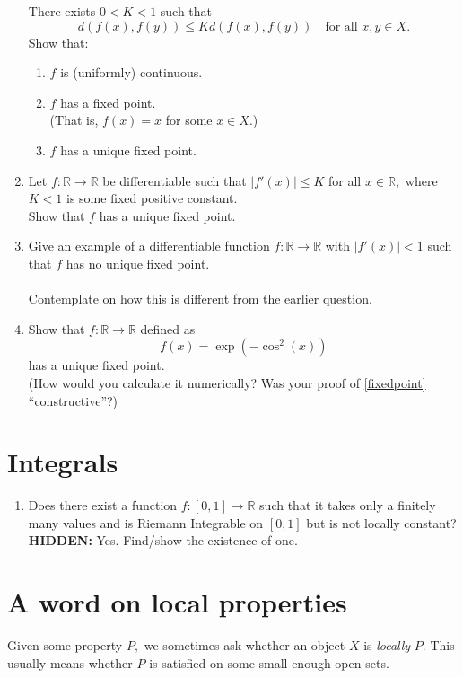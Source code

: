 \documentclass[12pt]{article}
\theoremstyle{definition}
\numberwithin{thm}{section}
\newcommand{\hint}[1]{\textbf{HIDDEN:} {\color[rgb]{0.95, 0.95, 0.95}#1}}
\begin{document}
\begin{enumerate}
	There exists $0 < K < 1$ such that
	\begin{equation*} 
		d(f(x), f(y)) \le Kd(f(x), f(y)) \quad \text{for all } x, y \in X.
	\end{equation*}
	Show that:
	\begin{enumerate}
		\item $f$ is (uniformly) continuous.
		\item \label{fixedpoint} $f$ has a fixed point.\\
		(That is, $f(x) = x$ for some $x \in X$.)
		\item $f$ has a unique fixed point.
	\end{enumerate}
	\item Let $f:\mathbb{R} \to \mathbb{R}$ be differentiable such that $|f'(x)| \le K$ for all $x \in \mathbb{R},$ where $K < 1$ is some fixed positive constant.\\
	Show that $f$ has a unique fixed point.
	\item Give an example of a differentiable function $f:\mathbb{R} \to \mathbb{R}$ with $|f'(x)| < 1$ such that $f$ has no unique fixed point.\\~\\
	Contemplate on how this is different from the earlier question.
	\item Show that $f:\mathbb{R} \to \mathbb{R}$ defined as 
	\begin{equation*} 
		f(x) = \exp\left(-\cos^2(x)\right)
	\end{equation*}
	has a unique fixed point.\\
	(How would you calculate it numerically? Was your proof of \ref{fixedpoint} ``constructive''?)
\end{enumerate}
\newpage\section{Integrals}
\begin{enumerate}
	\item Does there exist a function $f:[0, 1] \to \mathbb{R}$ such that it takes only a finitely many values and is Riemann Integrable on $[0, 1]$ but is not locally constant?\\
	\hint{Yes. Find/show the existence of one.}
\end{enumerate}
\newpage\section{A word on local properties}
Given some property $P,$ we sometimes ask whether an object $X$ is \emph{locally} $P$. This usually means whether $P$ is satisfied on some small enough open sets.\\
\end{document}
